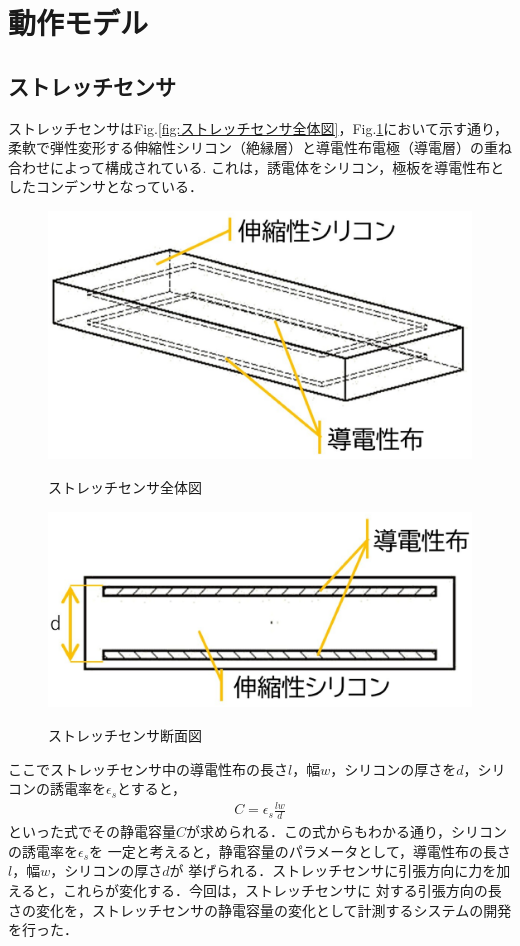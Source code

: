 \section{動作モデル}
\subsection{ストレッチセンサ}
ストレッチセンサはFig.\ref{fig:ストレッチセンサ全体図}，Fig.\ref{fig:ストレッチセンサ断面図}において示す通り，
柔軟で弾性変形する伸縮性シリコン（絶縁層）と導電性布電極（導電層）の重ね合わせによって構成されている.
これは，誘電体をシリコン，極板を導電性布としたコンデンサとなっている．

\begin{figure}[h]
    \begin{center}
        \label{fig:ストレッチセンサ全体図}
        \includegraphics[width=0.4\columnwidth,clip]{./2_measurement/slide1.eps}
        \caption{ストレッチセンサ全体図}     
        \label{fig:ストレッチセンサ断面図}
        \includegraphics[width=0.4\columnwidth,clip]{./2_measurement/slide2.eps}
        \caption{ストレッチセンサ断面図}
    \end{center}
\end{figure}

ここでストレッチセンサ中の導電性布の長さ$l$，幅$w$，シリコンの厚さを$d$，シリコンの誘電率を$\epsilon{}_s$とすると，
\begin{eqnarray}
    C=\epsilon{}_s\frac{lw}{d}
    \label{eq:cap}
\end{eqnarray}
といった式でその静電容量$C$が求められる．この式からもわかる通り，シリコンの誘電率を$\epsilon{}_s$を
一定と考えると，静電容量のパラメータとして，導電性布の長さ$l$，幅$w$，シリコンの厚さ$d$が
挙げられる．ストレッチセンサに引張方向に力を加えると，これらが変化する．今回は，ストレッチセンサに
対する引張方向の長さの変化を，ストレッチセンサの静電容量の変化として計測するシステムの開発を行った．

